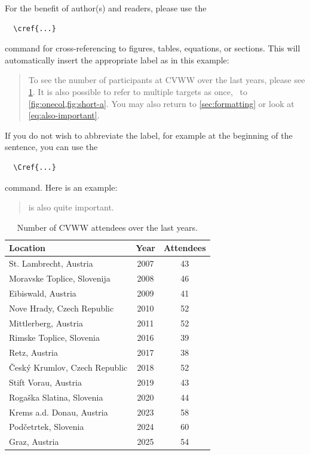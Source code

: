 For the benefit of author(s) and readers, please use the
{\small\begin{verbatim}
  \cref{...}
\end{verbatim}}
\noindent
command for cross-referencing to figures, tables, equations, or sections.
This will automatically insert the appropriate label as in this example:
\begin{quotation}
  To see the number of participants at CVWW over the last years, please see \cref{tab:participants}.
  It is also possible to refer to multiple targets as once, \eg~to \cref{fig:onecol,fig:short-a}.
  You may also return to \cref{sec:formatting} or look at \cref{eq:also-important}.
\end{quotation}
If you do not wish to abbreviate the label, for example at the beginning of the sentence, you can use the
{\small\begin{verbatim}
  \Cref{...}
\end{verbatim}}
\noindent
command. Here is an example:
\begin{quotation}
   is also quite important.
\end{quotation}

\begin{table}
   \centering
   \caption{Number of CVWW attendees over the last years. }
   \label{tab:participants}
   \begin{tabular}{l|c|c}
   \toprule
    \textbf{Location} & \textbf{Year} & \textbf{Attendees}\\
   \midrule
   St. Lambrecht, Austria  & 2007 & 43 \\
   Moravske Toplice, Slovenija & 2008 & 46 \\
   Eibiswald, Austria & 2009 & 41 \\
   Nove Hrady, Czech Republic & 2010 & 52 \\
   Mittlerberg, Austria & 2011 & 52 \\
   Rimske Toplice, Slovenia & 2016 & 39 \\
   Retz, Austria & 2017 & 38 \\
   \v{C}esk\'{y} Krumlov, Czech Republic & 2018 & 52 \\
   Stift Vorau, Austria & 2019 & 43 \\
   Rogaška Slatina, Slovenia & 2020 & 44\\
   Krems a.d. Donau, Austria & 2023 & 58\\
   Pod\v{c}etrtek, Slovenia & 2024 & 60\\
   Graz, Austria & 2025 & 54\\
   \bottomrule
   \end{tabular}
\end{table}



